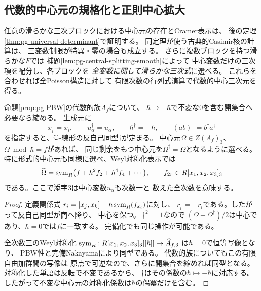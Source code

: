 \subsection{代数的中心元の規格化と正則中心拡大}
任意の滑らかな三次ブロックにおける中心元の存在とCramer表示は、
後の定理\ref{thm:pg-universal-determinant}で証明する。
同定理が使う古典的Casimir核の計算は、
三変数制限が特異・零の場合も成立する。
さらに複数ブロックを持つ滑らかな$F$では
補題\ref{lem:pg-central-splitting-smooth}によって
中心変数だけの三次項を配分し、各ブロックを
\emph{全変数に関して滑らかな三次式}に選べる。
これらを合わせれば全Poisson構造に対して
有限次数の行列式演算で代数的中心三次元を得る。

\begin{lemma}[中心三次元の偶性]\label{lem:pg-center-parity}
命題\ref{prop:pg-PBW}の代数的族$A_f$について、
$\hbar\mapsto-\hbar$で不変な$0$を含む開集合へ必要なら縮める。
生成元に
\begin{equation}
 x_i^\dagger=x_i,\qquad u_\alpha^\dagger=u_\alpha,\qquad
 \hbar^\dagger=-\hbar,\qquad(ab)^\dagger=b^\dagger a^\dagger
\end{equation}
を指定すると、$\mathbb C$-線形の反自己同型$\dagger$が定まる。
中心元$\Omega\in Z(A_f)_3$、$\Omega\bmod\hbar=f$があれば、
同じ剰余をもつ中心元を$\Omega^\dagger=\Omega$となるように選べる。
特に形式的中心元も同様に選べ、Weyl対称化表示では
\begin{equation}
 \widehat\Omega
 =\operatorname{sym}_R\bigl(f+\hbar^2 f_2+\hbar^4 f_4+\cdots\bigr),
 \qquad f_{2r}\in R[x_1,x_2,x_3]_3
\end{equation}
である。ここで添字$3$は中心変数$u_\alpha$も次数一と
数えた全次数を意味する。
\end{lemma}
\begin{proof}
定義関係式
$r_i=[x_j,x_k]-\hbar\operatorname{sym}_R(f_{x_i})$に対し、
$r_i^\dagger=-r_i$である。したがって反自己同型が商へ降り、
中心を保つ。$\dagger^2=1$なので
$(\Omega+\Omega^\dagger)/2$は中心であり、$\hbar=0$では$f$に一致する。
完備化でも同じ操作が可能である。

全次数三のWeyl対称化
$\operatorname{sym}_R:R[x_1,x_2,x_3]_3[[\hbar]]\to\widehat A_{f,3}$
は$\hbar=0$で恒等写像となり、
PBW性と完備Nakayamaにより同型である。
代数的族についてもこの有限自由加群間の写像は
原点で可逆なので、さらに開集合を縮めれば同型となる。
対称化した単語は反転で不変であるから、
$\dagger$はその係数の$\hbar\mapsto-\hbar$に対応する。
したがって不変な中心元の対称化係数は$\hbar$の偶冪だけを含む。
\end{proof}

